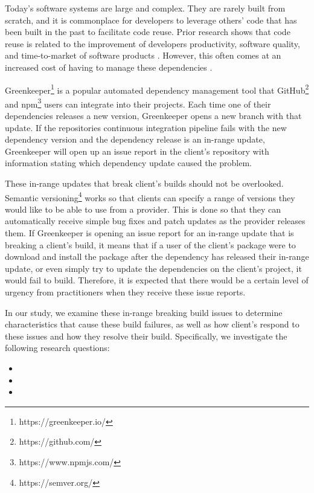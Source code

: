 Today's software systems are large and complex. They are rarely built from scratch, and it is commonplace for developers to leverage others' code that has been built in the past to facilitate code reuse. Prior research shows that code reuse is related to the improvement of developers productivity, software quality, and time-to-market of software products \cite{FSE2017_Abdalkareem_WhyUseTrivialPackages} \cite{ESE2020_Abdalkareem_ImpactOfUsingTrivialPackages}. However, this often comes at an increased cost of having to manage these dependencies \cite{ACM2017_Mirhosseini_AutomatedPullRequests}.
\par
Greenkeeper\footnote{https://greenkeeper.io/} is a popular automated dependency management tool that GitHub\footnote{https://github.com/} and npm\footnote{https://www.npmjs.com/} users can integrate into their projects. Each time one of their dependencies releases a new version, Greenkeeper opens a new branch with that update. If the repositories continuous integration pipeline fails with the new dependency version and the dependency release is an in-range update, Greenkeeper will open up an issue report in the client’s repository with information stating which dependency update caused the problem.
\par
These in-range updates that break client's builds should not be overlooked. Semantic versioning\footnote{https://semver.org/} works so that clients can specify a range of versions they would like to be able to use from a provider. This is done so that they can automatically receive simple bug fixes and patch updates as the provider releases them. If Greenkeeper is opening an issue report for an in-range update that is breaking a client's build, it means that if a user of the client's package were to download and install the package after the dependency has released their in-range update, or even  simply try to update the dependencies on the client's project, it would fail to build. Therefore, it is expected that there would be a certain level of urgency from practitioners when they receive these issue reports.
\par
In our study, we examine these in-range breaking build issues to determine characteristics that cause these build failures, as well as how client’s respond to these issues and how they resolve their build. Specifically, we investigate the following research questions: 
\begin{itemize}
    \item \rqone
    \item \rqtwo
    \item \rqthree
\end{itemize}
